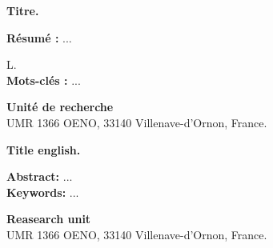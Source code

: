 \thispagestyle{empty}
\vspace*{0pt}
\vfill

\afterpage{\blankpage}
\newpage

\begin{small}
\begin{singlespace}
\begin{center}
\textbf{Titre.}
\end{center}
\textbf{Résumé :} 
...

L.\newline
\\
\textbf{Mots-clés :} ... \\

\noindent\makebox[\linewidth]{\rule{\textwidth}{0.4pt}}

\vfill
\begin{center}
    \textbf{Unité de recherche}\\
UMR 1366 OENO, 33140 Villenave-d'Ornon, France.
\end{center}

\afterpage{\blankpage}
\newpage

\begin{center}
\textbf{Title english.}
\end{center}
\textbf{Abstract:} 
...
\\
\newline
\textbf{Keywords:} ... \\

\noindent\makebox[\linewidth]{\rule{\textwidth}{0.4pt}}

\vfill
\begin{center}
    \textbf{Reasearch unit}\\
UMR 1366 OENO, 33140 Villenave-d'Ornon, France.
\end{center}
\end{singlespace}
\end{small}